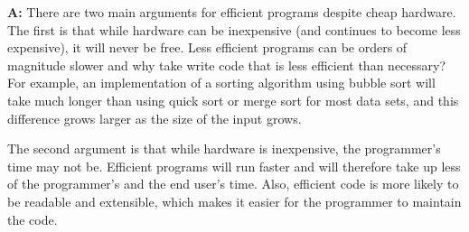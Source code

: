 \documentclass[letterpaper, 11pt]{article}
\newcommand{\A}{\noindent\textbf{A:} }
\begin{document}
\A There are two main arguments for efficient programs despite cheap hardware.
The first is that while hardware can be inexpensive (and continues to become
less expensive), it will never be free. Less efficient programs can be orders of
magnitude slower and why take write code that is less efficient than necessary?
For example, an implementation of a sorting algorithm using bubble sort will
take much longer than using quick sort or merge sort for most data sets, and
this difference grows larger as the size of the input grows. 

The second argument is that while hardware is inexpensive, the programmer's time
may not be. Efficient programs will run faster and will therefore take up less
of the programmer's and the end user's time. Also, efficient code is more
likely to be readable and extensible, which makes it easier for the programmer
to maintain the code. 
\end{document}
